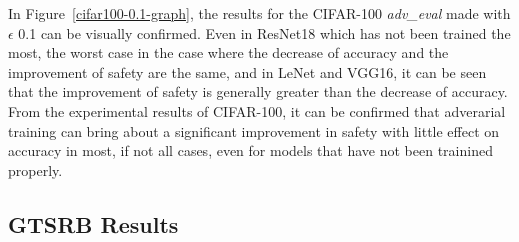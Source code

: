 \documentclass[journal,article,submit,moreauthors,pdftex]{Definitions/mdpi}
\begin{document}
In Figure~\ref{cifar100-0.1-graph}, the results for the CIFAR-100 {\it adv\_eval} made with \begin{math}\epsilon\end{math} 0.1 can be visually confirmed.
Even in ResNet18 which has not been trained the most, the worst case in the case where the decrease of accuracy and the improvement of safety are the same,
and in LeNet and VGG16, it can be seen that the improvement of safety is generally greater than the decrease of accuracy.
From the experimental results of CIFAR-100, it can be confirmed that adverarial training can bring about a significant improvement in safety with little effect on accuracy in most, if not all cases, even for models that have not been  trainined properly.

\subsection{GTSRB Results}
\end{document}
